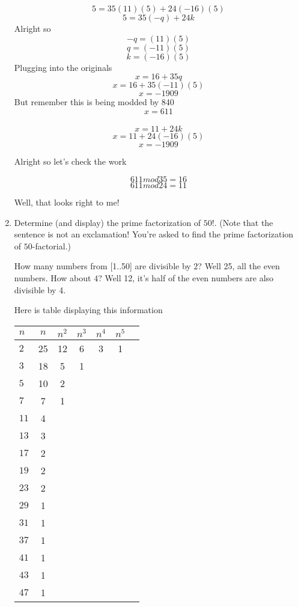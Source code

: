 \documentclass[10pt, AMS Euler]{article}
\begin{document}
\begin{enumerate}
            $$ 5 = 35(11)(5) + 24(-16)(5) $$
            $$ 5 = 35(-q) +24k $$
            Alright so 
            $$ -q = (11)(5) $$
            $$ q = (-11)(5) $$
            $$ k = (-16)(5) $$
            Plugging into the originals
            $$ x = 16 + 35 q $$
            $$ x = 16 + 35 (-11)(5) $$
            $$ x = -1909 $$
            But remember this is being modded by 840
            $$ x = 611 $$
            \\
            $$ x = 11 + 24 k $$
            $$ x = 11 + 24 (-16)(5) $$
            $$ x = -1909 $$
            
            Alright so let's check the work

            $$ 611 mod 35 = 16 $$
            $$ 611 mod 24 = 11 $$

            Well, that looks right to me!
            

  
		\newpage
		\item  Determine (and display) the prime factorization of $50!$.  (Note that the sentence is not an exclamation! You're asked to find the prime factorization of $50$-factorial.) 

        How many numbers from [1..50] are divisible by $2$? Well 25, all the even numbers.
        How about $4$? Well 12, it's half of the even numbers are also divisible by 4. 

        Here is table displaying this information

            \begin{center}
                \begin{tabular}{l|cccccc}
                    {$n$ } & $n$ & $n^2$ & $n^3$ & $n^4$ & $n^5$  \\
                    \hline
                    {$2$ } & 25 & 12 & 6 & 3 & 1  \\
                    {$3$} & 18 & 5 & 1 & &   \\
                    {$5$} & 10 & 2 & & &   \\
                    {$7$} & 7 & 1 & & &   \\
                    {$11$} & 4 & & & &   \\
                    {$13$} & 3 & & & &   \\
                    {$17$} & 2 & & & &   \\
                    {$19$} & 2 & & & &   \\
                    {$23$} & 2 & & & &   \\
                    {$29$} & 1 & & & &   \\
                    {$31$} & 1 & & & &   \\
                    {$37$} & 1 & & & &   \\
                    {$41$} & 1 & & & &   \\
                    {$43$} & 1 & & & &   \\
                    {$47$} & 1 & & & &   \\
                    

\end{tabular}
\end{center}
\end{enumerate}
\end{document}
